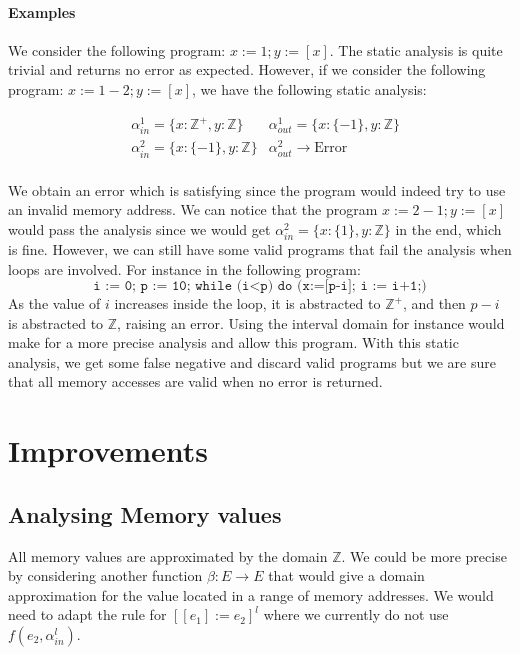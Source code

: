 \paragraph{Examples}

We consider the following program: $x:= 1; y:= [x]$.
The static analysis is quite trivial and returns no error as expected.
However, if we consider the following program: $x:= 1 - 2; y:= [x]$, we have the following static analysis:

\begin{align*}
	& \alpha_{in}^1 = \lbrace x: \mathbb{Z}^{+}, y: \mathbb{Z} \rbrace & \alpha_{out}^1 = \lbrace x: \lbrace -1 \rbrace, y: \mathbb{Z} \rbrace \\
	& \alpha_{in}^2 = \lbrace x: \lbrace -1 \rbrace, y: \mathbb{Z} \rbrace & \alpha_{out}^2 \longrightarrow \text{Error} \\
\end{align*}

We obtain an error which is satisfying since the program would indeed try to use an invalid memory address.
We can notice that the program $x:= 2 - 1; y:= [x]$ would pass the analysis since we would get $\alpha_{in}^2 = \lbrace x: \lbrace 1 \rbrace, y: \mathbb{Z} \rbrace$ in the end, which is fine.
However, we can still have some valid programs that fail the analysis when loops are involved.
For instance in the following program:
$$\texttt{i := 0; p := 10; while (i<p) do (x:=[p-i]; i := i+1;)}$$
As the value of $i$ increases inside the loop, it is abstracted to $\mathbb{Z}^{+}$, and then $p-i$ is abstracted to $\mathbb{Z}$, raising an error. Using the interval domain for instance would make for a more precise analysis and allow this program.
With this static analysis, we get some false negative and discard valid programs but we are sure that all memory accesses are valid when no error is returned.
 

\section*{Improvements}

\subsection*{Analysing Memory values}
All memory values are approximated by the domain $\mathbb{Z}$.
We could be more precise by considering another function $\beta: E \longrightarrow E$ that would give a domain approximation for the value located in a range of memory addresses.
We would need to adapt the rule for $\left[[e_1] := e_2\right]^l$ where we currently do not use $f(e_2, \alpha_{in}^l)$.


